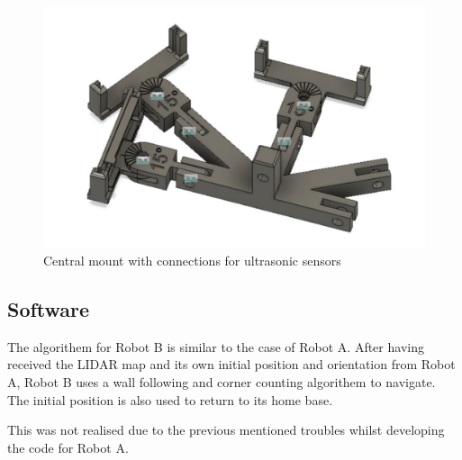 \documentclass[11pt]{article}
\begin{document}
	\begin{figure}[h!]
		\centering
		\includegraphics[scale=0.5]{central_mount_conns}
		\caption{Central mount with connections for ultrasonic sensors}
	\end{figure}

	\pagebreak
	
	\subsection{Software}
	The algorithem for Robot B is similar to the case of Robot A. After having received the LIDAR map and its own initial position and orientation from Robot A, Robot B uses a wall following and corner counting algorithem to navigate. The initial position is also used to return to its home base. \newline
	
	This was not realised due to the previous mentioned troubles whilst developing the code for Robot A.
	
\end{document}
